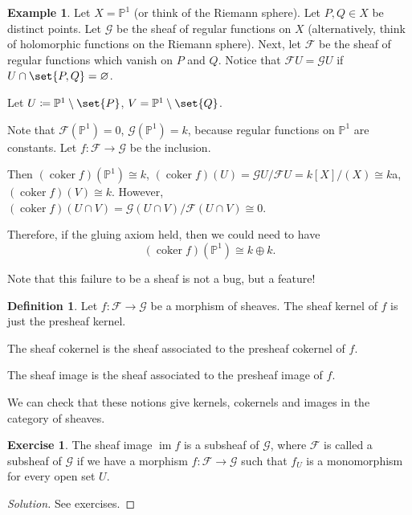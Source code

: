 \documentclass[a4paper]{amsbook}
\theoremstyle{definition}
\newtheorem*{definition*}{Definition}
\newtheorem*{example*}{Example}
\newtheorem*{exercise*}{Exercise}
\DeclareMathOperator\coker{coker}
\DeclareMathOperator\im{im}
\begin{document}
\begin{example*}
\label{ProjectiveExample}
Let $X = \mathbb{P}^1$ (or think of the Riemann sphere). Let $P, Q \in X$ be distinct
points. Let $\mathcal{G}$ be the sheaf of regular functions on $X$ (alternatively, think
of holomorphic functions on the Riemann sphere). Next, let $\mathcal{F}$ be the sheaf
of regular functions which vanish on $P$ and $Q$. Notice that
$\mathcal{F}U = \mathcal{G}U$ if $U\cap \set{P, Q} = \varnothing$.

Let $U \coloneqq \mathbb{P}^1\setminus\set{P}$, $V = \mathbb{P}^1\setminus\set{Q}$.

Note that $\mathcal{F}(\mathbb{P}^1) = 0$, $\mathcal{G}(\mathbb{P}^1) = k$,
because regular functions on $\mathbb{P}^1$ are constants. Let
$f\colon \mathcal{F}\to \mathcal{G}$ be the inclusion.

Then $(\coker f)(\mathbb{P}^1) \cong k$, $(\coker f)(U) = \mathcal{G}U/\mathcal{F}U = k[X]/(X) \cong k$a,
$(\coker f)(V) \cong k$. However, $(\coker f)(U\cap V) = \mathcal{G}(U\cap V)/\mathcal{F}(U\cap V) \cong 0$.

Therefore, if the gluing axiom held, then we could need to have
\[ (\coker f)(\mathbb{P}^1) \cong k\oplus k. \]

Note that this failure to be a sheaf is not a bug, but a feature!
\end{example*}

\begin{definition*}
\label{SheafKernel}
Let $f\colon \mathcal{F}\to \mathcal{G}$ be a morphism of sheaves. The sheaf kernel of $f$
is just the presheaf kernel.

The sheaf cokernel is the sheaf associated to the presheaf cokernel of $f$.

The sheaf image is the sheaf associated to the presheaf image of $f$.

We can check that these notions give kernels, cokernels and images in the category
of sheaves.
\end{definition*}

\begin{exercise*}
\label{SheafImageExercise}
The sheaf image $\im f$ is a subsheaf of $\mathcal{G}$, where $\mathcal{F}$ is called a
subsheaf of $\mathcal{G}$ if we have a morphism $f\colon \mathcal{F}\to \mathcal{G}$
such that $f_U$ is a monomorphism for every open set $U$.
\end{exercise*}
\begin{proof}[Solution]
See exercises.
\end{proof}
\end{document}
